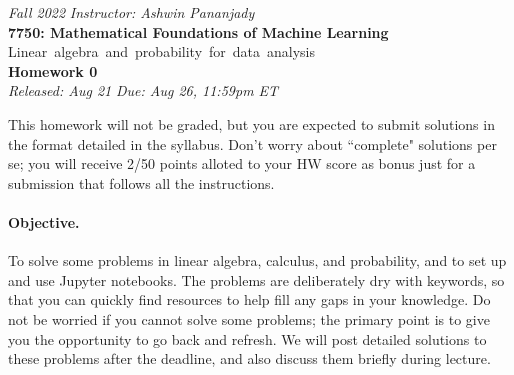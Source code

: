 \documentclass[11pt,twoside]{article}
\begin{document}
\begin{center}
\normalsize {\it Fall 2022} \hfill {\it Instructor: Ashwin Pananjady} \\
\LARGE{\bf 7750: Mathematical Foundations of Machine Learning} \\
\Large \mbox{Linear algebra and probability for data analysis} \\

\vspace{2mm}
\Large{\bf Homework 0} \\
\normalsize {\it Released: Aug 21} \hfill {\it Due: Aug 26, 11:59pm ET} \\
\end{center}

 This homework will not be graded, but you are expected to submit solutions in the format detailed in the syllabus. Don't worry about ``complete" solutions per se; you will receive 2/50 points alloted to your HW score as bonus just for a submission that follows all the instructions.

\paragraph{Objective.} To solve some problems in linear algebra, calculus, and probability, and to set up and use Jupyter notebooks. The problems are deliberately dry with keywords, so that you can quickly find resources to help fill any gaps in your knowledge. Do not be worried if you cannot solve some problems; the primary point is to give you the opportunity to go back and refresh. We will post detailed solutions to these problems after the deadline, and also discuss them briefly during lecture.
\end{document}
